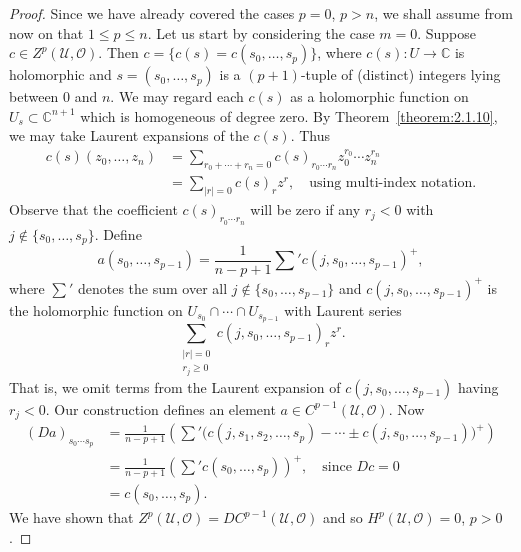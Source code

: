 \begin{proof}
Since we have already covered the cases $p=0$, $p>n$, we shall assume from now on that $1\leq p\leq n$. Let us start by considering the case $m=0$. Suppose $c\in Z^p(\mathcal U,\mathcal O)$. Then $c=\{c(s)=c(s_0,\ldots,s_p)\}$, where $c(s):U\to\mathbb C$ is holomorphic and $s=(s_0,\ldots,s_p)$ is a $(p+1)$-tuple of (distinct) integers lying between $0$ and $n$. We may regard each $c(s)$ as a holomorphic function on $U_s\subset\mathbb C^{n+1}$ which is homogeneous of degree zero. By Theorem~\ref{theorem:2.1.10}, we may take Laurent expansions of the $c(s)$. Thus
\[
\begin{aligned}
c(s)(z_0,\ldots,z_n)&=\sum_{r_0+\cdots+r_n=0}c(s)_{r_0\cdots r_n}z_0^{r_0}\cdots z_n^{r_n}\\
&=\sum_{|r|=0}c(s)_rz^r,\quad\text{using multi-index notation.}
\end{aligned}
\]
Observe that the coefficient $c(s)_{r_0\cdots r_n}$ will be zero if any $r_j<0$ with $j\notin\{s_0,\ldots,s_p\}$. Define
\[
a(s_0,\ldots,s_{p-1})=\frac1{n-p+1}\sum{}'c(j,s_0,\ldots,s_{p-1})^+,
\]
where $\sum{}'$ denotes the sum over all $j\notin\{s_0,\ldots,s_{p-1}\}$ and $c(j,s_0,\ldots,s_{p-1})^+$ is the holomorphic function on $U_{s_0}\cap\cdots\cap U_{s_{p-1}}$ with Laurent series
\[
\sum_{\substack{|r|=0\\r_j\geq0}}c(j,s_0,\ldots,s_{p-1})_rz^r.
\]
That is, we omit terms from the Laurent expansion of $c(j,s_0,\ldots,s_{p-1})$ having $r_j<0$. Our construction defines an element $a\in C^{p-1}(\mathcal U,\mathcal O)$. Now
\[
\begin{aligned}
(Da)_{s_0\cdots s_p}
&=\frac1{n-p+1}\left(\sum{}'\bigl(c(j,s_1,s_2,\ldots,s_p)-\cdots\pm c(j,s_0,\ldots,s_{p-1})\bigr)^+\right)\\
&=\frac1{n-p+1}\left(\sum{}'c(s_0,\ldots,s_p)\right)^+,\quad\text{since }Dc=0\\
&=c(s_0,\ldots,s_p).
\end{aligned}
\]
We have shown that $Z^p(\mathcal U,\mathcal O)=DC^{p-1}(\mathcal U,\mathcal O)$ and so $H^p(\mathcal U,\mathcal O)=0$, $p>0$.


\end{proof}
